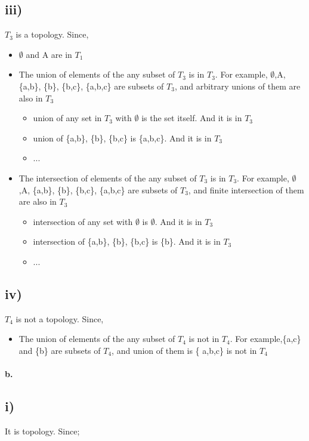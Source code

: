 \documentclass[11pt]{article}
\begin{document}
\subsection*{iii)}
$T_3$ is a topology. Since,
\begin{itemize}
    \item $\emptyset$ and A are in $T_1$
    \item The union of elements of the any subset of $T_3$ is in $T_3$. For example, $\emptyset$,A, \{a,b\}, \{b\}, \{b,c\}, \{a,b,c\} are subsets of $T_3$, and arbitrary unions of them are also in $T_3$ 
        \begin{itemize}
        \item union of any set in $T_3$ with $\emptyset$ is the set itself. And it is in $T_3$
        \item union of \{a,b\}, \{b\}, \{b,c\} is \{a,b,c\}. And it is in $T_3$
        \item ...
    \end{itemize}
    \item The intersection of elements of the any subset of $T_3$ is in $T_3$. For example, $\emptyset$,A, \{a,b\}, \{b\}, \{b,c\}, \{a,b,c\} are subsets of $T_3$, and finite intersection of them are also in $T_3$
    \begin{itemize}
        \item intersection of any set with $\emptyset$ is $\emptyset$. And it is in $T_3$
        \item intersection of \{a,b\}, \{b\}, \{b,c\} is \{b\}. And it is in $T_3$
        \item ...
    \end{itemize}
\end{itemize}
\subsection*{iv)}
$T_4$ is not a topology. Since,
\begin{itemize}
    \item The union of elements of the any subset of $T_4$ is not in $T_4$. For example,\{a,c\} and \{b\} are subsets of $T_4$, and union of them is  \{ a,b,c\} is not in $T_4$
\end{itemize}

\paragraph{b.}
\subsection*{i)}
It is topology. Since;
\end{document}
